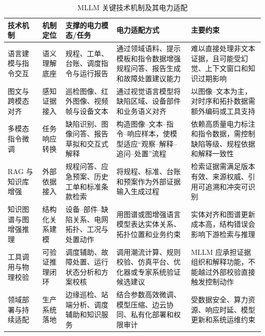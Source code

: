 \documentclass[10.5pt,compsoc]{CjC}
\theoremstyle{mystyle}
\begin{document}
\begin{table}[t]
\centering
\caption{MLLM 关键技术机制及其电力适配}
\label{tab:model_mechanisms}
\songti
\setlength{\tabcolsep}{3pt}
\renewcommand{\arraystretch}{1.16}
\begin{tabularx}{\textwidth}{p{} p{} p{} p{} X}
\toprule
技术机制 & 机制定位 & 支撑的电力模态/任务 & 电力适配方式 & 主要约束 \\
\midrule
语言建模与指令交互 & 语义理解底座 & 规程、工单、台账、调度指令与运行报告 & 通过领域语料、提示模板和指令数据增强规程问答、报告生成和故障处置建议能力\cite{brown2020language,ghafari2025comprehensive} & 难以直接处理非文本证据，且可能受幻觉、上下文窗口和知识过期影响 \\
图文与跨模态对齐 & 感知证据接入 & 巡检图像、红外图像、视频帧与设备文本 & 通过视觉语言模型将缺陷区域、设备部件和业务语义对齐\cite{radford2021learning,liu2023visual,ouyang2026powervlm} & 以图像--文本为主，对时序和拓扑数据需额外编码或工具支持 \\
多模态指令微调 & 任务响应转换 & 缺陷识别、图像问答、报告草拟和交互式解释 & 构造图像--文本--指令--响应样本，使模型适应``观察--解释--追问--处置''流程\cite{xiang2025mllm_power} & 依赖高质量电力标注和指令数据，需控制缺陷等级、规程依据和解释一致性 \\
RAG 与知识库增强 & 外部依据接入 & 规程问答、应急预案、历史工单和标准条款检索 & 将规程、标准、台账和预案作为外部证据输入生成过程\cite{lewis2020retrieval,liwenchao2025rag} & 检索证据需满足版本有效、来源权威、引用可追溯和冲突可识别 \\
知识图谱与图增强推理 & 结构化关系建模 & 设备--部件--缺陷关系、电网拓扑、工况与处置动作 & 用图谱或图增强语言模型表达实体关系、拓扑位置和业务约束\cite{ji2022survey,bernier2025powergraph,shen2026hgrag} & 实体对齐和图谱更新成本高，结构错误会影响下游检索与推理 \\
工具调用与物理校验 & 可验证推理闭环 & 调度辅助、故障处置、运行状态分析和方案校核 & 调用潮流计算、规则校验、仿真平台、优化器或专家系统验证候选建议\cite{yao2023react,yang2025operator,zhangjun2023operation} & MLLM 应承担证据组织和解释功能，不能越过外部校验直接触发控制动作 \\
领域部署与持续适配 & 生产系统落地 & 边缘巡检、站端分析、调度辅助和知识服务 & 结合参数高效微调、模型压缩、边云协同、私有化部署和权限审计\cite{ouyang2026powervlm,fangfang2025computing,du2026key} & 受数据安全、算力资源、响应时延、模型更新和系统运维约束 \\
\bottomrule
\end{tabularx}
\end{table}
\end{document}
